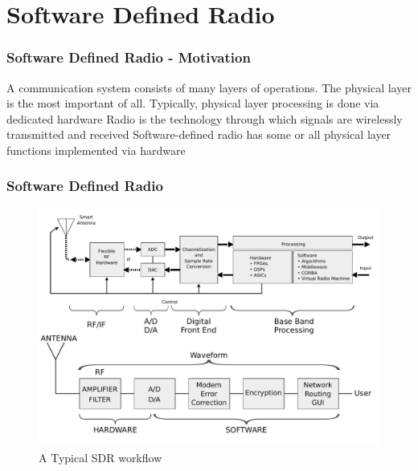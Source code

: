 \documentclass[10pt]{beamer}
\begin{document}
\section{Software Defined Radio}

\begin{frame}
    \frametitle{Software Defined Radio - Motivation}
    \begin{outline}
    \1 A communication system consists of many layers of operations.
    \1 The physical layer is the most important of all.
    \1 Typically, physical layer processing is done via dedicated hardware
    \1 Radio is the technology through which signals are wirelessly transmitted and received
    \1 Software-defined radio has some or all physical layer functions implemented via hardware
\end{outline}
\end{frame}

\begin{frame}
    \frametitle{Software Defined Radio}
\begin{figure}[h!]
    \centering
    \includegraphics[width=.8\textwidth]{SDR_et_WF.pdf}
    \caption{A Typical SDR workflow}
\end{figure}
\end{frame}
\end{document}
